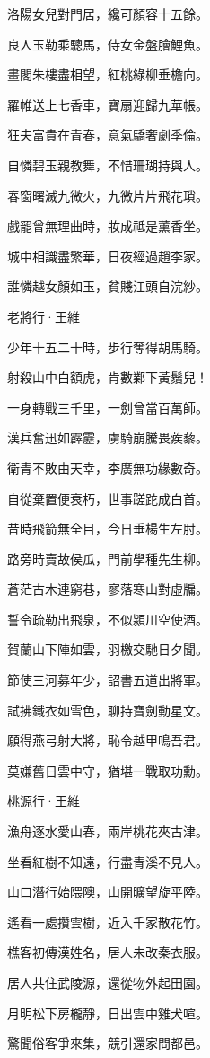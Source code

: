 \documentclass[12pt,a4paper]{ctexbook}
\begin{document}
洛陽女兒對門居，纔可顏容十五餘。\par
良人玉勒乘驄馬，侍女金盤膾鯉魚。\par
畫閣朱樓盡相望，紅桃綠柳垂檐向。\par
羅帷送上七香車，寶扇迎歸九華帳。\par
狂夫富貴在青春，意氣驕奢劇季倫。\par
自憐碧玉親教舞，不惜珊瑚持與人。\par
春窗曙滅九微火，九微片片飛花瑣。\par
戲罷曾無理曲時，妝成祗是薰香坐。\par
城中相識盡繁華，日夜經過趙李家。\par
誰憐越女顏如玉，貧賤江頭自浣紗。\par
老將行·王維\par
少年十五二十時，步行奪得胡馬騎。\par
射殺山中白額虎，肯數鄴下黃鬚兒！\par
一身轉戰三千里，一劍曾當百萬師。\par
漢兵奮迅如霹靂，虜騎崩騰畏蒺藜。\par
衛青不敗由天幸，李廣無功緣數奇。\par
自從棄置便衰朽，世事蹉跎成白首。\par
昔時飛箭無全目，今日垂楊生左肘。\par
路旁時賣故侯瓜，門前學種先生柳。\par
蒼茫古木連窮巷，寥落寒山對虛牖。\par
誓令疏勒出飛泉，不似潁川空使酒。\par
賀蘭山下陣如雲，羽檄交馳日夕聞。\par
節使三河募年少，詔書五道出將軍。\par
試拂鐵衣如雪色，聊持寶劍動星文。\par
願得燕弓射大將，恥令越甲鳴吾君。\par
莫嫌舊日雲中守，猶堪一戰取功勳。\par
桃源行·王維\par
漁舟逐水愛山春，兩岸桃花夾古津。\par
坐看紅樹不知遠，行盡青溪不見人。\par
山口潛行始隈隩，山開曠望旋平陸。\par
遙看一處攢雲樹，近入千家散花竹。\par
樵客初傳漢姓名，居人未改秦衣服。\par
居人共住武陵源，還從物外起田園。\par
月明松下房櫳靜，日出雲中雞犬喧。\par
驚聞俗客爭來集，競引還家問都邑。\par
\end{document}
